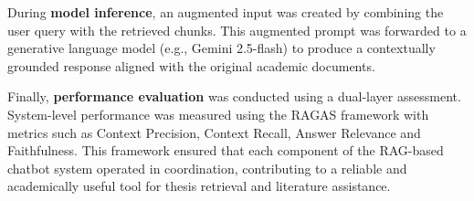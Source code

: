 \begin{refsection}
During \textbf{model inference}, an augmented input was created by combining the user query with the retrieved chunks. This augmented prompt was forwarded to a generative language model (e.g., Gemini 2.5-flash) to produce a contextually grounded response aligned with the original academic documents.

Finally, \textbf{performance evaluation} was conducted using a dual-layer assessment. System-level performance was measured using the RAGAS framework with metrics such as Context Precision, Context Recall, Answer Relevance and Faithfulness. This framework ensured that each component of the RAG-based chatbot system operated in coordination, contributing to a reliable and academically useful tool for thesis retrieval and literature assistance.

\clearpage

\printbibliography[heading=subbibintoc, title={\centering Notes}]
\end{refsection}

